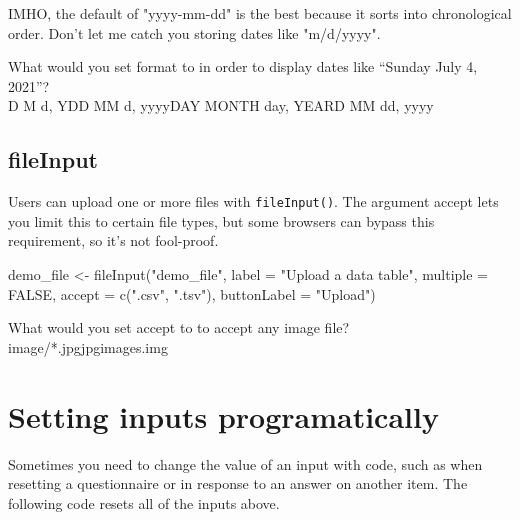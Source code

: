 \documentclass[
  oneside]{book}
\newenvironment{Shaded}{\begin{snugshade}}{\end{snugshade}}
\newcommand{\AttributeTok}[1]{\textcolor[rgb]{0.77,0.63,0.00}{#1}}
\newcommand{\ConstantTok}[1]{\textcolor[rgb]{0.00,0.00,0.00}{#1}}
\newcommand{\FunctionTok}[1]{\textcolor[rgb]{0.00,0.00,0.00}{#1}}
\newcommand{\NormalTok}[1]{#1}
\newcommand{\OtherTok}[1]{\textcolor[rgb]{0.56,0.35,0.01}{#1}}
\newcommand{\StringTok}[1]{\textcolor[rgb]{0.31,0.60,0.02}{#1}}
\begin{document}
\begin{info}
IMHO, the default of \StringTok{"yyyy-mm-dd"} is the best because it sorts into chronological order. Don't let me catch you storing dates like \StringTok{"m/d/yyyy"}.

\end{info}

What would you set \AttributeTok{format} to in order to display dates like ``Sunday July 4, 2021''?\\
D M d, YDD MM d, yyyyDAY MONTH day, YEARD MM dd, yyyy

\hypertarget{fileinput}{%
\subsection{fileInput}\label{fileinput}}

Users can upload one or more files with \texttt{fileInput}\texttt{()}. The argument \AttributeTok{accept} lets you limit this to certain file types, but some browsers can bypass this requirement, so it's not fool-proof.

\begin{Shaded}
\begin{Highlighting}[]
\NormalTok{demo\_file }\OtherTok{\textless{}{-}} \FunctionTok{fileInput}\NormalTok{(}\StringTok{"demo\_file"}\NormalTok{,}
                       \AttributeTok{label =} \StringTok{"Upload a data table"}\NormalTok{,}
                       \AttributeTok{multiple =} \ConstantTok{FALSE}\NormalTok{,}
                       \AttributeTok{accept =} \FunctionTok{c}\NormalTok{(}\StringTok{".csv"}\NormalTok{, }\StringTok{".tsv"}\NormalTok{),}
                       \AttributeTok{buttonLabel =} \StringTok{"Upload"}\NormalTok{)}
\end{Highlighting}
\end{Shaded}

What would you set \AttributeTok{accept} to to accept any image file?\\
image/*.jpgjpgimages.img

\hypertarget{setting-inputs-programatically}{%
\section{Setting inputs programatically}\label{setting-inputs-programatically}}

Sometimes you need to change the value of an input with code, such as when resetting a questionnaire or in response to an answer on another item. The following code resets all of the inputs above.
\end{document}
